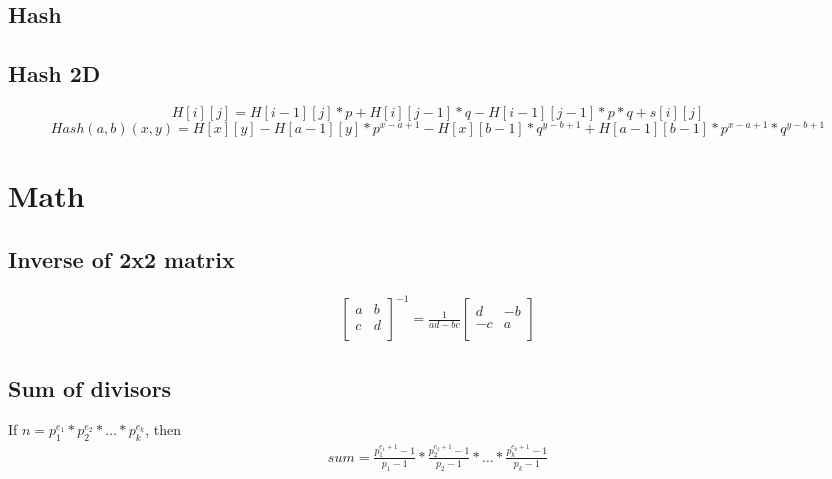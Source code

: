 \documentclass[A4 paper, 12pt, oneside, landscape]{article}
\begin{document}
\begin{multicols}{2}
	\subsection{Hash}
	
	
	\subsection{Hash 2D}
	\begin{dmath}
	H[i][j] = H[i - 1][j] * p + H[i][j - 1] * q - H[i - 1][j - 1] * p * q + s[i][j]
	\end{dmath}
	\begin{dmath}
	Hash(a,b)(x,y) = H[x][y] - H[a - 1][y]*p^{x - a + 1} - H[x][b - 1]*q^{y - b + 1} + H[a - 1][b - 1] * p^{x - a + 1} * q^{y - b + 1}
	\end{dmath}

\section{Math}	
    \subsection{Inverse of 2x2 matrix}
    \begin{align*}
        \begin{bmatrix}
        a & b \\
        c & d \\
        \end{bmatrix} ^ {-1} = \frac{1}{ad - bc}
        \begin{bmatrix}
            d & -b \\
            -c & a \\
        \end{bmatrix}
    \end{align*}
    
    \subsection{Sum of divisors}
    If $n = p^{e_1}_1 * p^{e_2}_2 * \dots * p^{e_k}_k$, then
    \begin{align*}
        sum = \frac{p^{e_1 + 1}_1 - 1}{p_1 - 1} * \frac{p^{e_2 + 1}_2 - 1}{p_2 - 1} * \dots * \frac{p^{e_k + 1}_k - 1}{p_k - 1}
    \end{align*}
    

\end{multicols}
\end{document}

